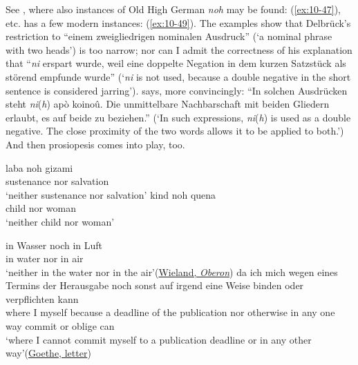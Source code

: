 See \citet[\href{https://archive.org/details/germanische-syntax-i-zu-den-negativen-s/page/n61/mode/2up}{55f}]{delbruck_negativen_1910}, %
where also instances of Old High German \textit{noh} may be found: (\ref{ex:10-47}), etc. \citet[]{paul_deutsches_1908} has a few modern instances: (\ref{ex:10-49}). The examples show that Delbrück's restriction %
to ``einem zweigliedrigen nominalen Ausdruck'' (`a nominal phrase with two heads') is too narrow; nor can I admit the correctness of his explanation that ``\textit{ni} erspart wurde, weil eine doppelte Negation in dem kurzen Satzstück als störend empfunde wurde'' (`\textit{ni} is not used, because a double negative in the short sentence is considered jarring'). \citet[]{neckel1912germanischen} says,
more convincingly: ``In solchen Ausdrücken steht \textit{ni}(\textit{h}) apò koinoû. Die unmittelbare Nachbarschaft mit beiden Gliedern erlaubt, es auf beide zu beziehen.'' (`In such expressions, \textit{ni}(\textit{h}) is used as a double negative. The close proximity of the two words allows it to be applied to both.') And then prosiopesis comes into play, too. 

\ea \label{ex:10-47}
\ea
\gll laba noh gizami\\
 sustenance nor salvation\\
\glt `neither sustenance nor salvation'
\ex
\gll kind noh quena\\
 child nor woman\\
\glt `neither child nor woman'
\z
\z

\ea \label{ex:10-49}
\ea
\gll in Wasser noch in Luft\\
 in water nor in air\\
\glt `neither in the water nor in the air'\hfill(\href{https://www.projekt-gutenberg.org/wieland/oberon/oberon83.html}{Wieland, \textit{Oberon}})
\ex
\gll da ich mich wegen eines Termins der Herausgabe noch sonst auf irgend eine Weise binden oder verpflichten kann\\ %
 where I myself because a deadline {of the} publication nor otherwise in any one way commit or oblige can\\
\glt `where I cannot commit myself to a publication deadline or in any other way'\hfill(\href{http://www.zeno.org/Literatur/M/Goethe,+Johann+Wolfgang/Briefe/1810}{Goethe, letter})
\z
\z

